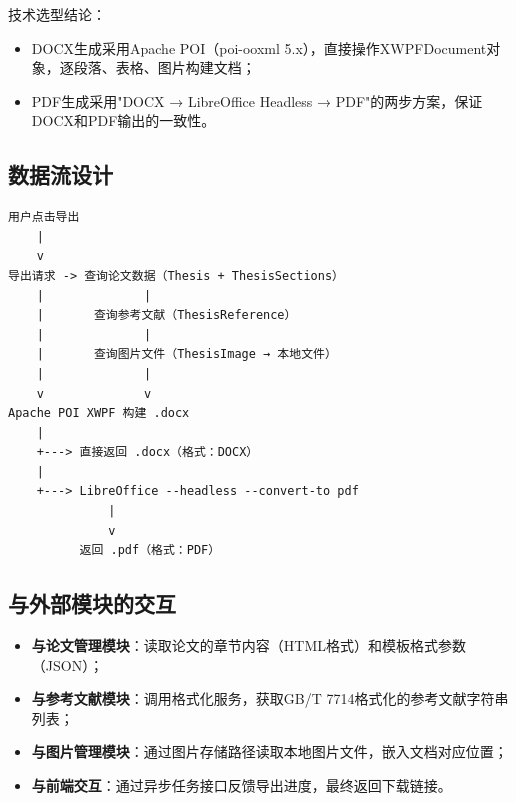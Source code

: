 技术选型结论：
\begin{itemize}
    \item DOCX生成采用Apache POI（poi-ooxml 5.x），直接操作XWPFDocument对象，逐段落、表格、图片构建文档；
    \item PDF生成采用"DOCX → LibreOffice Headless → PDF"的两步方案，保证DOCX和PDF输出的一致性。
\end{itemize}

\subsection{数据流设计}

\begin{verbatim}
用户点击导出
    |
    v
导出请求 -> 查询论文数据（Thesis + ThesisSections）
    |              |
    |       查询参考文献（ThesisReference）
    |              |
    |       查询图片文件（ThesisImage → 本地文件）
    |              |
    v              v
Apache POI XWPF 构建 .docx
    |
    +---> 直接返回 .docx（格式：DOCX）
    |
    +---> LibreOffice --headless --convert-to pdf
              |
              v
          返回 .pdf（格式：PDF）
\end{verbatim}

\subsection{与外部模块的交互}

\begin{itemize}
    \item \textbf{与论文管理模块}：读取论文的章节内容（HTML格式）和模板格式参数（JSON）；
    \item \textbf{与参考文献模块}：调用格式化服务，获取GB/T 7714格式化的参考文献字符串列表；
    \item \textbf{与图片管理模块}：通过图片存储路径读取本地图片文件，嵌入文档对应位置；
    \item \textbf{与前端交互}：通过异步任务接口反馈导出进度，最终返回下载链接。
\end{itemize}
